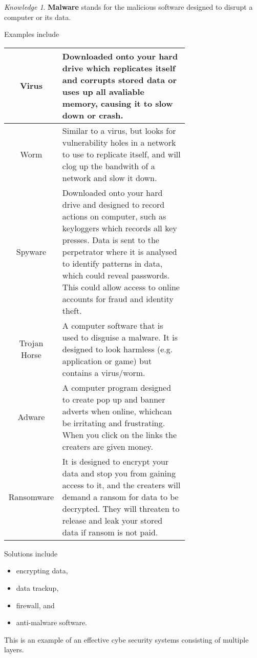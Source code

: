 \documentclass[8pt]{article}
\theoremstyle{remark}
\newtheorem{knowledge}[method]{Knowledge}
\begin{document}
            \begin{knowledge}
                \textbf{Malware} stands for the malicious software designed to disrupt a computer or its data.

                Examples include
                \begin{center}
                    \begin{tabular}{c|p{0.7\linewidth}}
                        Virus & Downloaded onto your hard drive which replicates itself and corrupts stored data or uses up all avaliable memory, causing it to slow down or crash.\\\hline
                        Worm & Similar to a virus, but looks for vulnerability holes in a network to use to replicate itself, and will clog up the bandwith of a network and slow it down.\\\hline
                        Spyware & Downloaded onto your hard drive and designed to record actions on computer, such as keyloggers which records all key presses. Data is sent to the perpetrator where  it is analysed to identify patterns in data, which could reveal passwords. This could allow access to online accounts for fraud and identity theft.\\\hline
                        Trojan Horse & A computer software that is used to disguise a malware. It is designed to look harmless (e.g. application or game) but contains a virus/worm.\\\hline
                        Adware & A computer program designed to create pop up and banner adverts when online, whichcan be irritating and frustrating. When you click on the links the creaters are given money.\\\hline
                        Ransomware & It is designed to encrypt your data and stop you from gaining access to it, and the creaters will demand a ransom for data to be decrypted. They will threaten to release and leak your stored data if ransom is not paid.
                    \end{tabular}
                \end{center}
                
                Solutions include
                \begin{itemize}
                    \item encrypting data,
                    \item data trackup,
                    \item firewall, and
                    \item anti-malware software.
                \end{itemize}

                This is an example of an effective cybe security systems consisting of multiple layers.
            \end{knowledge}
            
\end{document}
